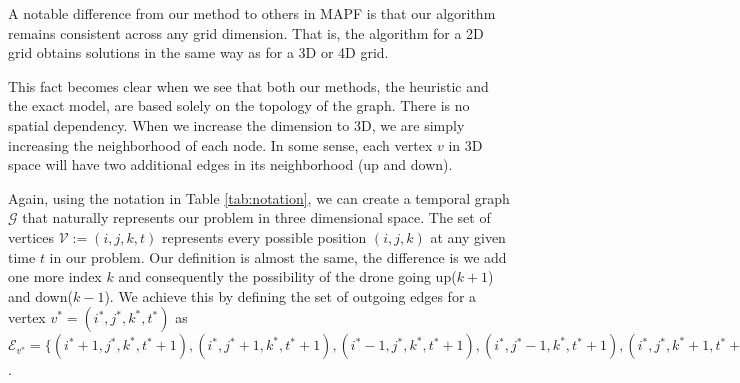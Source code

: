 A notable difference from our method to others in MAPF is that our algorithm remains consistent across any grid dimension. That is, the algorithm for a 2D grid obtains solutions in the same way as for a 3D or 4D grid.

This fact becomes clear when we see that both our methods, the heuristic and the exact model, are based solely on the topology of the graph. There is no spatial dependency. When we increase the dimension to 3D, we are simply increasing the neighborhood of each node. In some sense, each vertex $v$ in 3D space will have two additional edges in its neighborhood (up and down).

Again, using the notation in Table \ref{tab:notation}, we can create a temporal graph $\mathcal{G}$ that naturally represents our problem in three dimensional space. The set of vertices $\mathcal{V} := (i,j,k,t)$ represents every possible position $(i,j,k)$ at any given time $t$ in our problem. Our definition is almost the same, the difference is we add one more index $k$ and consequently the possibility of the drone going up($k+1$) and down($k-1$). We achieve this by defining the set of outgoing edges for a vertex $v^* = (i^*,j^*,k^*,t^*)$ as $\mathcal{E}_{v^*} = \{ 
(i^*+1,j^*,k^*,t^*+1), 
(i^*,j^*+1,k^*,t^*+1), 
(i^*-1,j^*,k^*,t^*+1), 
(i^*,j^*-1,k^*,t^*+1), 
(i^*,j^*,k^*+1,t^*+1),
(i^*,j^*,k^*-1,t^*+1),
(i^*,j^*,k^*,t^*+1)
\}$.

